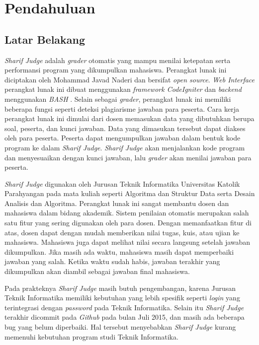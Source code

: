 \chapter{Pendahuluan}
\label{chap:intro}
   
\section{Latar Belakang}
\label{sec:label}
\textit{Sharif Judge} adalah \textit{grader} otomatis yang mampu menilai ketepatan serta performansi program yang dikumpulkan mahasiswa. Perangkat lunak ini diciptakan oleh Mohammad Javad Naderi dan bersifat \textit{open source}. \textit{Web Interface} perangkat lunak ini dibuat menggunakan \textit{framework CodeIgniter} dan \textit{backend} menggunakan \textit{BASH} \cite{mjnaderi:14:sharifjudge}. Selain sebagai \textit{grader}, perangkat lunak ini memiliki beberapa fungsi seperti deteksi plagiarisme jawaban para peserta. Cara kerja perangkat lunak ini dimulai dari dosen memasukan data yang dibutuhkan berupa soal, peserta, dan kunci jawaban. Data yang dimasukan tersebut dapat diakses oleh para peserta. Peserta dapat mengumpulkan jawaban dalam bentuk kode program ke dalam \textit{Sharif Judge}. \textit{Sharif Judge} akan menjalankan kode program dan menyesuaikan dengan kunci jawaban, lalu \textit{grader} akan menilai jawaban para peserta.

\textit{Sharif Judge} digunakan oleh Jurusan Teknik Informatika Universitas Katolik Parahyangan pada mata kuliah seperti Algoritma dan Struktur Data serta Desain Analisis dan Algoritma. Perangkat lunak ini sangat membantu dosen dan mahasiswa dalam bidang akademik. Sistem penilaian otomatis merupakan salah satu fitur yang sering digunakan oleh para dosen. Dengan memanfaatkan fitur di atas, dosen dapat dengan mudah memberikan nilai tugas, kuis, atau ujian ke mahasiswa. Mahasiswa juga dapat melihat nilai secara langsung setelah jawaban dikumpulkan. Jika masih ada waktu, mahasiswa masih dapat memperbaiki jawaban yang salah. Ketika waktu sudah habis, jawaban terakhir yang dikumpulkan akan diambil sebagai jawaban final mahasiswa.

Pada prakteknya \textit{Sharif Judge} masih butuh pengembangan, karena Jurusan Teknik Informatika memiliki kebutuhan yang lebih spesifik seperti \textit{login} yang terintegrasi dengan \textit{password} pada Teknik Informatika. Selain itu \textit{Sharif Judge} terakhir dicommit pada \textit{Github} pada bulan Juli 2015, dan masih ada beberapa bug yang belum diperbaiki. Hal tersebut menyebabkan \textit{Sharif Judge} kurang memenuhi kebutuhan program studi Teknik Informatika. 

